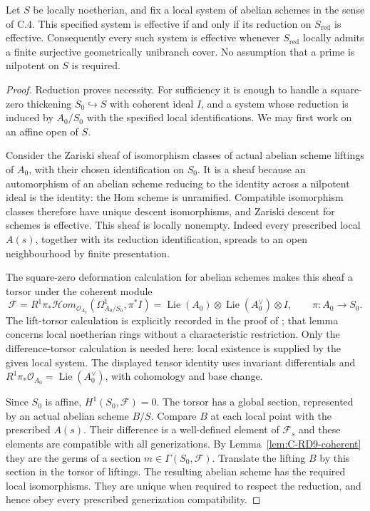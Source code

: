 \begin{theorem}
\label{thm:C-RD9}
Let $S$ be locally noetherian, and fix a local system of abelian
schemes in the sense of C.4. This specified system is effective if
and only if its reduction on $S_{\mathrm{red}}$ is effective.
Consequently every such system is effective whenever
$S_{\mathrm{red}}$ locally admits a finite surjective geometrically
unibranch cover. No assumption that a prime is nilpotent on $S$ is
required.
\end{theorem}
\begin{proof}
Reduction proves necessity. For sufficiency it is enough to handle a
square-zero thickening $S_0\hookrightarrow S$ with coherent ideal
$I$, and a system whose reduction is induced by $A_0/S_0$ with the
specified local identifications. We may first work on an affine open
of $S$.

Consider the Zariski sheaf of isomorphism classes of actual abelian
scheme liftings of $A_0$, with their chosen identification on $S_0$.
It is a sheaf because an automorphism of an abelian scheme reducing
to the identity across a nilpotent ideal is the identity: the Hom
scheme is unramified. Compatible isomorphism classes therefore have
unique descent isomorphisms, and Zariski descent for schemes is
effective. This sheaf is locally nonempty. Indeed every prescribed
local $A(s)$, together with its reduction identification, spreads to
an open neighbourhood by finite presentation.

The square-zero deformation calculation for abelian schemes makes
this sheaf a torsor under the coherent module
\[
 \mathcal F
 =R^1\pi_*\mathcal Hom_{\mathcal O_{A_0}}
       (\Omega^1_{A_0/S_0},\pi^*I)
 =\operatorname{Lie}(A_0)\otimes
   \operatorname{Lie}(A_0^\vee)\otimes I,
 \qquad \pi:A_0\longrightarrow S_0.
\]
The lift-torsor calculation is explicitly recorded in the proof of
\cite[Lemma~24, p.590]{VasiuZink2010Purity}; that lemma concerns
local noetherian rings without a characteristic restriction. Only
the difference-torsor calculation is needed here: local existence is
supplied by the given local system. The displayed tensor identity
uses invariant differentials and
$R^1\pi_*\mathcal O_{A_0}=\operatorname{Lie}(A_0^\vee)$, with
cohomology and base change.

Since $S_0$ is affine, $H^1(S_0,\mathcal F)=0$. The torsor has a
global section, represented by an actual abelian scheme $B/S$.
Compare $B$ at each local point with the prescribed $A(s)$. Their
difference is a well-defined element of $\mathcal F_s$ and these
elements are compatible with all generizations. By
Lemma~\ref{lem:C-RD9-coherent} they are the germs of a section
$m\in\Gamma(S_0,\mathcal F)$. Translate the lifting $B$ by this
section in the torsor of liftings. The resulting abelian scheme has
the required local isomorphisms. They are unique when required to
respect the reduction, and hence obey every prescribed generization
compatibility.


\end{proof}
